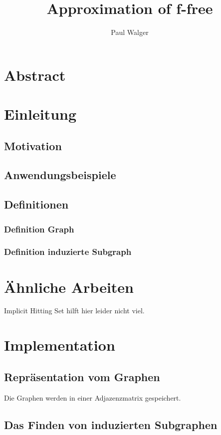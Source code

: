 \documentclass[12pt,a4paper,onecolumn,oneside,titlepage]{article}
\author{Paul Walger}
\title{Approximation of f-free}
\begin{document}
\maketitle
\tableofcontents
\newpage

\section{Abstract}

\section{Einleitung}


\subsection{Motivation}

\subsection{Anwendungsbeispiele}

\subsection{Definitionen}
\subsubsection{Definition Graph}
\subsubsection{Definition induzierte Subgraph}

\section{Ähnliche Arbeiten}
\cite{Moreno13} Implicit Hitting Set hilft hier leider nicht viel.

\section{Implementation}
\subsection{Repräsentation vom Graphen}
Die Graphen werden in einer Adjazenzmatrix gespeichert.

\subsection{Das Finden von induzierten Subgraphen}
\end{document}
